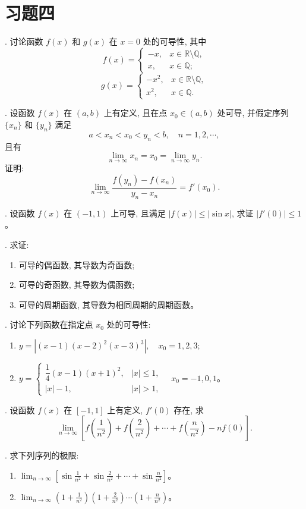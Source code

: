 \documentclass[UTF8, 12pt, fontset=fandol, oneside]{ctexart}
\begin{document}
\section*{习题四}

. 讨论函数 $f(x)$ 和 $g(x)$ 在 $x=0$ 处的可导性, 其中
\[
  f(x)=
  \begin{cases}
    -x, & x\in\mathbb R\setminus\mathbb Q,\\
    x, & x\in\mathbb Q;
  \end{cases}
\]
\[
  g(x)=
  \begin{cases}
    -x^2, & x\in\mathbb R\setminus\mathbb Q,\\
    x^2, & x\in\mathbb Q.
  \end{cases}
\]

. 设函数 $f(x)$ 在 $(a,b)$ 上有定义, 且在点 $x_0\in(a,b)$ 处可导, 并假定序列 $\{x_n\}$ 和 $\{y_n\}$ 满足
\[
  a<x_n<x_0<y_n<b,\quad n=1,2,\cdots,
\]
且有
\[
  \lim_{n\to\infty}x_n=x_0=\lim_{n\to\infty}y_n.
\]
证明:
\[
  \lim_{n\to\infty}\frac{f(y_n)-f(x_n)}{y_n-x_n}=f'(x_0).
\]

. 设函数 $f(x)$ 在 $(-1,1)$ 上可导, 且满足 $|f(x)|\leqslant|\sin x|$, 求证 $|f'(0)|\leqslant1$。

. 求证:
\begin{enumerate}
  \item 可导的偶函数, 其导数为奇函数;
  \item 可导的奇函数, 其导数为偶函数;
  \item 可导的周期函数, 其导数为相同周期的周期函数。
\end{enumerate}

. 讨论下列函数在指定点 $x_0$ 处的可导性:
\begin{enumerate}
  \item $y=|(x-1)(x-2)^2(x-3)^3|,\quad x_0=1,2,3$;
  \item
  $
  y=
  \begin{cases}
    \dfrac14(x-1)(x+1)^2, & |x|\leqslant1,\\
    |x|-1, & |x|>1,
  \end{cases}
  \quad x_0=-1,0,1
  $。
\end{enumerate}

. 设函数 $f(x)$ 在 $[-1,1]$ 上有定义, $f'(0)$ 存在, 求
\[
  \lim_{n\to\infty}
  \left[
    f\left(\frac1{n^2}\right)
    +
    f\left(\frac2{n^2}\right)
    +\cdots+
    f\left(\frac n{n^2}\right)
    -
    nf(0)
  \right].
\]

. 求下列序列的极限:
\begin{enumerate}
  \item
  $\displaystyle
  \lim_{n\to\infty}
  \left[
    \sin\frac1{n^2}+\sin\frac2{n^2}+\cdots+\sin\frac n{n^2}
  \right]
  $。
  \item
  $\displaystyle
  \lim_{n\to\infty}
  \left(1+\frac1{n^2}\right)
  \left(1+\frac2{n^2}\right)\cdots
  \left(1+\frac n{n^2}\right)
  $。
\end{enumerate}
\end{document}
